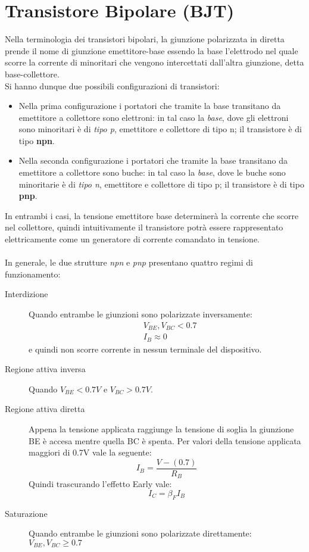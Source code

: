 \documentclass{article}
\begin{document}
\section*{Transistore Bipolare (BJT)}
Nella terminologia dei transistori bipolari, la giunzione polarizzata in diretta prende il nome di giunzione emettitore-base essendo la base l’elettrodo nel quale scorre la corrente di minoritari che vengono intercettati dall’altra giunzione, detta base-collettore.\\
Si hanno dunque due possibili configurazioni di transistori:
\begin{itemize}
\item Nella prima configurazione i portatori che tramite la base transitano da emettitore a collettore sono elettroni: in tal caso la \textit{base}, dove gli elettroni sono minoritari è di \textit{tipo p}, emettitore e collettore di tipo n; il transistore è di tipo \textbf{npn}.
\item Nella seconda configurazione i portatori che tramite la base transitano da emettitore a collettore sono buche: in tal caso la \textit{base}, dove le buche sono minoritarie è di \textit{tipo n}, emettitore e collettore di tipo p; il transistore è di tipo \textbf{pnp}.
\end{itemize}
In entrambi i casi, la tensione emettitore base determinerà la corrente che scorre nel collettore, quindi intuitivamente il transistore potrà essere rappresentato elettricamente come un generatore di corrente comandato in tensione.\\
\\
In generale, le due strutture \textit{npn} e \textit{pnp} presentano quattro regimi di funzionamento:
\begin{description}
\item [Interdizione] Quando entrambe le giunzioni sono polarizzate inversamente:
\begin{align*}
&V_{BE}, V_{BC} < 0.7\\
&I_B \approx 0
\end{align*}
e quindi non scorre corrente in nessun terminale del dispositivo.
\item [Regione attiva inversa] 
Quando $V_{BE} < 0.7V$ e $V_{BC} > 0.7V$.
\item [Regione attiva diretta] Appena la tensione applicata raggiunge la tensione di soglia la giunzione BE è accesa mentre quella BC è spenta. Per valori della tensione applicata maggiori di 0.7V vale la seguente:
\begin{equation*}
I_B = \frac{V - (0.7)}{R_B}
\end{equation*}
Quindi trascurando l'effetto Early vale:
\begin{equation*}
I_C = \beta_F I_B
\end{equation*}
\item [Saturazione] Quando entrambe le giunzioni sono polarizzate direttamente:\\
\hspace*{2cm} $V_{BE}, V_{BC} \geqslant 0.7$\\
\end{description}
\end{document}
